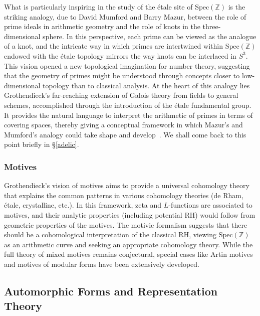 \documentclass{article}
\begin{document}
   What is particularly inspiring in the study of the \'etale site of $\mathrm{Spec}(\mathbb{Z})$ is the striking analogy, due to David Mumford and Barry Mazur, between the role of prime ideals in arithmetic geometry and the role of knots in the three-dimensional sphere. In this perspective, each prime can be viewed as the analogue of a knot, and the intricate way in which primes are intertwined within $\mathrm{Spec}(\mathbb{Z})$ endowed with the \'etale topology mirrors the way knots can be interlaced in $S^3$. This vision opened a new topological imagination for number theory, suggesting that the geometry of primes might be understood through concepts closer to low-dimensional topology than to classical analysis. At the heart of this analogy lies Grothendieck’s far-reaching extension of Galois theory from fields to general schemes, accomplished through the introduction of the \'etale fundamental group. It provides the natural language to interpret the arithmetic of primes in terms of covering spaces, thereby giving a conceptual framework in which Mazur’s and Mumford’s analogy could take shape and develop~\cite{Mazur1973}. We shall come back to this point briefly in \S \ref{adelic}.


   \subsubsection{Motives} Grothendieck's vision of motives aims to provide a universal cohomology theory that explains the common patterns in various cohomology theories (de Rham, étale, crystalline, etc.). In this framework, zeta and $L$-functions are associated to motives, and their analytic properties (including potential RH) would follow from geometric properties of the motives. The motivic formalism suggests that there should be a cohomological interpretation of the classical RH, viewing $\mathrm{Spec}(\mathbb{Z})$ as an arithmetic curve and seeking an appropriate cohomology theory. While the full theory of mixed motives remains conjectural, special cases like Artin motives and motives of modular forms have been extensively developed.
\subsection{Automorphic Forms and Representation Theory}
\end{document}
